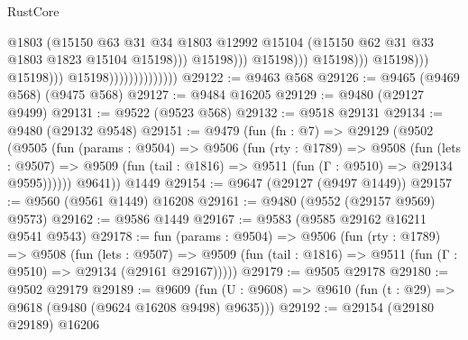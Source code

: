 \begin{lexlean}{RustCore}
\begin{coremodule}
                                                                @1803
                                                                (@15150
                                                                  @63
                                                                  @31
                                                                  @34
                                                                  @1803
                                                                  @12992
                                                                  @15104
                                                                  (@15150
                                                                    @62
                                                                    @31
                                                                    @33
                                                                    @1803
                                                                    @1823
                                                                    @15104
                                                                    @15198)))
                                                              @15198)))
                                                        @15198)))
                                                  @15198)))
                                            @15198)))
                                      @15198)))
                                @15198))))))))))))))
@29122 := @9463 @568
@29126 := @9465 (@9469 @568) (@9475 @568)
@29127 := @9484 @16205
@29129 := @9480 (@29127 @9499)
@29131 := @9522 (@9523 @568)
@29132 := @9518 @29131
@29134 := @9480 (@29132 @9548)
@29151 := @9479
    (fun (fn : @7) =>
    @29129
      (@9502
        (@9505
          (fun (params : @9504) =>
          @9506
            (fun (rty : @1789) =>
            @9508
              (fun (lets : @9507) =>
              @9509 (fun (tail : @1816) => @9511 (fun (Γ : @9510) => @29134 @9595))))))
        @9641))
    @1449
@29154 := @9647 (@29127 (@9497 @1449))
@29157 := @9560 (@9561 @1449) @16208
@29161 := @9480 (@9552 (@29157 @9569) @9573)
@29162 := @9586 @1449
@29167 := @9583 (@9585 @29162 @16211 @9541 @9543)
@29178 := fun (params : @9504) =>
  @9506
    (fun (rty : @1789) =>
    @9508
      (fun (lets : @9507) =>
      @9509 (fun (tail : @1816) => @9511 (fun (Γ : @9510) => @29134 (@29161 @29167)))))
@29179 := @9505 @29178
@29180 := @9502 @29179
@29189 := @9609
    (fun (U : @9608) => @9610 (fun (t : @29) => @9618 (@9480 (@9624 @16208 @9498) @9635)))
@29192 := @29154 (@29180 @29189) @16206

\end{coremodule}
\end{lexlean}
